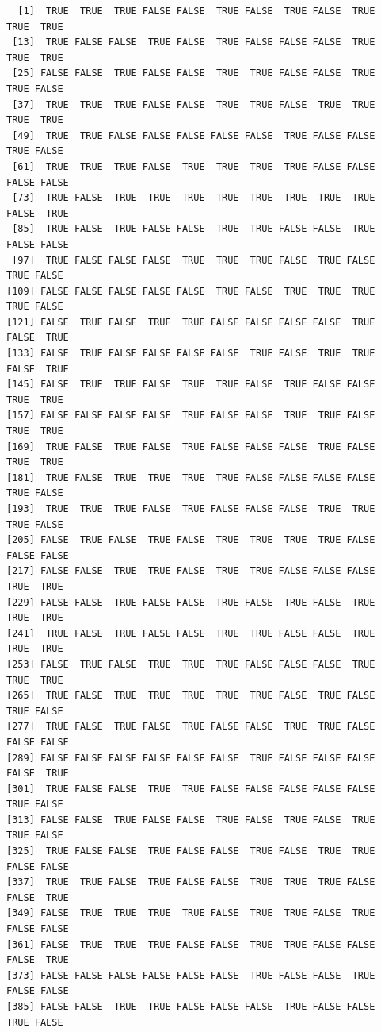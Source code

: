 \documentclass[
  letterpaper,
  DIV=11,
  numbers=noendperiod]{scrreprt}
\begin{document}
\begin{verbatim}
  [1]  TRUE  TRUE  TRUE FALSE FALSE  TRUE FALSE  TRUE FALSE  TRUE  TRUE  TRUE
 [13]  TRUE FALSE FALSE  TRUE FALSE  TRUE FALSE FALSE FALSE  TRUE  TRUE  TRUE
 [25] FALSE FALSE  TRUE FALSE FALSE  TRUE  TRUE FALSE FALSE  TRUE  TRUE FALSE
 [37]  TRUE  TRUE  TRUE FALSE FALSE  TRUE  TRUE FALSE  TRUE  TRUE  TRUE  TRUE
 [49]  TRUE  TRUE FALSE FALSE FALSE FALSE FALSE  TRUE FALSE FALSE  TRUE FALSE
 [61]  TRUE  TRUE  TRUE FALSE  TRUE  TRUE  TRUE  TRUE FALSE FALSE FALSE FALSE
 [73]  TRUE FALSE  TRUE  TRUE  TRUE  TRUE  TRUE  TRUE  TRUE  TRUE FALSE  TRUE
 [85]  TRUE FALSE  TRUE FALSE FALSE  TRUE  TRUE FALSE FALSE  TRUE FALSE FALSE
 [97]  TRUE FALSE FALSE FALSE  TRUE  TRUE  TRUE FALSE  TRUE FALSE  TRUE FALSE
[109] FALSE FALSE FALSE FALSE FALSE  TRUE FALSE  TRUE  TRUE  TRUE  TRUE FALSE
[121] FALSE  TRUE FALSE  TRUE  TRUE FALSE FALSE FALSE FALSE  TRUE FALSE  TRUE
[133] FALSE  TRUE FALSE FALSE FALSE FALSE  TRUE FALSE  TRUE  TRUE FALSE  TRUE
[145] FALSE  TRUE  TRUE FALSE  TRUE  TRUE FALSE  TRUE FALSE FALSE  TRUE  TRUE
[157] FALSE FALSE FALSE FALSE  TRUE FALSE FALSE  TRUE  TRUE FALSE  TRUE  TRUE
[169]  TRUE FALSE  TRUE FALSE  TRUE FALSE FALSE FALSE  TRUE FALSE  TRUE  TRUE
[181]  TRUE FALSE  TRUE  TRUE  TRUE  TRUE FALSE FALSE FALSE FALSE  TRUE FALSE
[193]  TRUE  TRUE  TRUE FALSE  TRUE FALSE FALSE FALSE  TRUE  TRUE  TRUE FALSE
[205] FALSE  TRUE FALSE  TRUE FALSE  TRUE  TRUE  TRUE  TRUE FALSE FALSE FALSE
[217] FALSE FALSE  TRUE  TRUE FALSE  TRUE  TRUE FALSE FALSE FALSE  TRUE  TRUE
[229] FALSE FALSE  TRUE FALSE FALSE  TRUE FALSE  TRUE FALSE  TRUE  TRUE  TRUE
[241]  TRUE FALSE  TRUE FALSE FALSE  TRUE  TRUE FALSE FALSE  TRUE  TRUE  TRUE
[253] FALSE  TRUE FALSE  TRUE  TRUE  TRUE FALSE FALSE FALSE  TRUE  TRUE  TRUE
[265]  TRUE FALSE  TRUE  TRUE  TRUE  TRUE  TRUE FALSE  TRUE FALSE  TRUE FALSE
[277]  TRUE FALSE  TRUE FALSE  TRUE FALSE FALSE  TRUE  TRUE FALSE FALSE FALSE
[289] FALSE FALSE FALSE FALSE FALSE FALSE  TRUE FALSE FALSE FALSE FALSE  TRUE
[301]  TRUE FALSE FALSE  TRUE  TRUE FALSE FALSE FALSE FALSE FALSE  TRUE FALSE
[313] FALSE FALSE  TRUE FALSE FALSE  TRUE FALSE  TRUE FALSE  TRUE  TRUE FALSE
[325]  TRUE FALSE FALSE  TRUE FALSE FALSE  TRUE FALSE  TRUE  TRUE FALSE FALSE
[337]  TRUE  TRUE FALSE  TRUE FALSE FALSE  TRUE  TRUE  TRUE FALSE FALSE  TRUE
[349] FALSE  TRUE  TRUE  TRUE  TRUE FALSE  TRUE  TRUE FALSE  TRUE FALSE FALSE
[361] FALSE  TRUE  TRUE  TRUE FALSE FALSE  TRUE  TRUE FALSE FALSE FALSE  TRUE
[373] FALSE FALSE FALSE FALSE FALSE FALSE  TRUE FALSE FALSE  TRUE FALSE FALSE
[385] FALSE FALSE  TRUE  TRUE FALSE FALSE FALSE  TRUE FALSE FALSE  TRUE FALSE

\end{verbatim}
\end{document}
